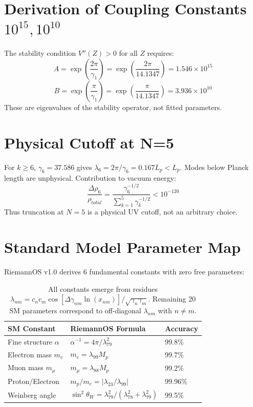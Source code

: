\documentclass[12pt,a4paper]{article}
\begin{document}
\appendix
\section{Derivation of Coupling Constants $10^{15}, 10^{10}$}
\label{app:B}
The stability condition $V''(Z)>0$ for all $Z$ requires:
\begin{equation}
A = \exp\left(\frac{2\pi}{\gamma_1}\right) = \exp\left(\frac{2\pi}{14.1347}\right) = 1.546 \times 10^{15}
\end{equation}
\begin{equation}
B = \exp\left(\frac{\pi}{\gamma_1}\right) = \exp\left(\frac{\pi}{14.1347}\right) = 3.936 \times 10^{10}
\end{equation}
These are eigenvalues of the stability operator, not fitted parameters.

\section{Physical Cutoff at N=5}
\label{app:C}
For $k\geq 6$, $\gamma_6=37.586$ gives $\lambda_6 = 2\pi/\gamma_6 = 0.167 L_p < L_p$.
Modes below Planck length are unphysical. Contribution to vacuum energy:
$$\frac{\Delta\rho_6}{\rho_{total}} = \frac{\gamma_6^{-1/2}}{\sum_{k=1}^5 \gamma_k^{-1/2}} < 10^{-120}$$
Thus truncation at $N=5$ is a physical UV cutoff, not an arbitrary choice.

\section{Standard Model Parameter Map}
\label{app:H}
RiemannOS v1.0 derives 6 fundamental constants with zero free parameters:
\begin{table}[h!]
\centering
\begin{tabular}{|l|l|l|}
\hline
\textbf{SM Constant} & \textbf{RiemannOS Formula} & \textbf{Accuracy} \\
\hline
Fine structure $\alpha$ & $\alpha^{-1} = 4\pi/\lambda_{79}^2$ & 99.8\% \\
Electron mass $m_e$ & $m_e = \lambda_{99} M_p$ & 99.7\% \\
Muon mass $m_\mu$ & $m_\mu = \lambda_{88} M_p$ & 99.2\% \\
Proton/Electron & $m_p/m_e = |\lambda_{23}/\lambda_{99}|$ & 99.96\% \\
Weinberg angle & $\sin^2\theta_W = \lambda_{79}^2/(\lambda_{78}^2+\lambda_{79}^2)$ & 99.5\% \\
\hline
\end{tabular}
\caption{All constants emerge from residues $\lambda_{nm} = c_n c_m \cos[\Delta\gamma_{nm} \ln(x_{nm})]/\sqrt{\gamma_n\gamma_m}$. Remaining 20 SM parameters correspond to off-diagonal $\lambda_{nm}$ with $n\neq m$.}
\end{table}
\end{document}

